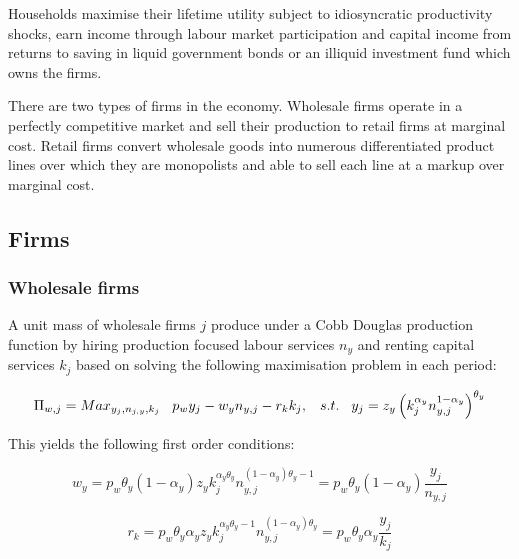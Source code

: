 \documentclass[12pt]{article}
\begin{document}
Households maximise their lifetime utility subject to idiosyncratic productivity shocks, earn income through labour market participation and capital income from  returns to saving in liquid government bonds or an illiquid investment fund which owns the firms. 

There are two types of firms in the economy. Wholesale firms operate in a perfectly competitive market and sell their production to retail firms at marginal cost. Retail firms convert wholesale goods into numerous differentiated product lines over which they are monopolists and able to sell each line at a markup over marginal cost.  

\subsection{Firms}

\subsubsection{Wholesale firms}

A unit mass of wholesale firms $j$ produce under a Cobb Douglas production function by hiring production focused labour services $n_y$ and renting capital services $k_{j}$ based on solving the following maximisation problem in each period:

\begin{equation}
\Pi_{w,j}=Max_{y_{j},n_{j,y},k_{j}} \hspace{3mm} p_{w}y_{j}-w_{y}n_{y,j}-r_{k}k_{j}, \hspace{3mm} s.t. \hspace{3mm} y_{j}=z_{y} \left( k_{j}^{\alpha_{y}} n_{y,j}^{1-\alpha_{y}} \right)^{\theta_{y}}
\label{eqn:piw}
\end{equation}

This yields the following first order conditions: 

\begin{equation}
w_{y}=p_{w}\theta_{y}(1-\alpha_{y}) z_{y} k_{j}^{\alpha_{y}\theta_{y}} n_{y,j}^{(1-\alpha_{y})\theta_{y}-1} =     p_{w}\theta_{y}(1-\alpha_{y})\frac{y_{j}}{n_{y,j}}
\label{eq:firm1}
\end{equation}

\begin{equation}
r_{k}=p_{w}\theta_{y}\alpha_{y} z_{y} k_{j}^{\alpha_{y}\theta_{y}-1} n_{y,j}^{(1-\alpha_{y})\theta_{y}} =     p_{w}\theta_{y}\alpha_{y}\frac{y_{j}}{k_j}
\label{eq:firm2}
\end{equation}
\end{document}
